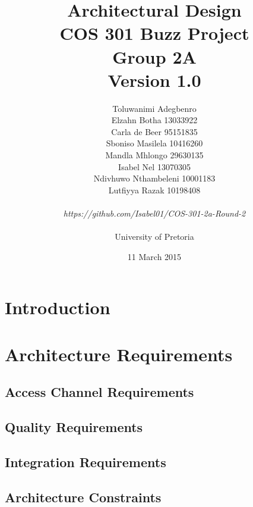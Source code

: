 \documentclass[a4paper]{article}
\title{Architectural Design
\\COS 301 Buzz Project
\\Group 2A
\\Version 1.0}
\author{Toluwanimi Adegbenro
\\Elzahn Botha 13033922
\\Carla de Beer 95151835
\\Sboniso Masilela 10416260
\\Mandla Mhlongo 29630135
\\Isabel Nel 13070305
\\Ndivhuwo Nthambeleni 10001183
\\Lutfiyya Razak 10198408
\\
\\
\textit{https://github.com/Isabel01/COS-301-2a-Round-2}
\\
\\ University of Pretoria}
\date{11 March 2015}
\begin{document}
\maketitle
\newpage


\tableofcontents
\newpage

\section{Introduction}

\section{Architecture Requirements}


\subsection{Access Channel Requirements}


\subsection{Quality Requirements}


\subsection{Integration Requirements}


\subsection{Architecture Constraints}
\end{document}
